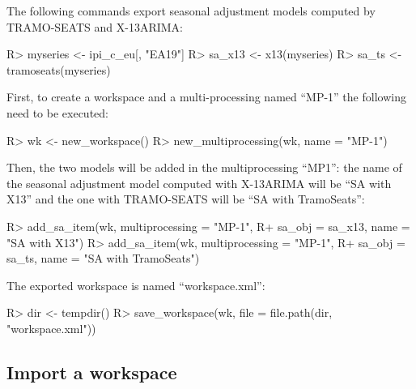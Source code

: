 \documentclass[article]{jss}
\begin{document}
The following commands export seasonal adjustment models computed by
TRAMO-SEATS and X-13ARIMA:

\begin{CodeChunk}

\begin{CodeInput}
R> myseries <- ipi_c_eu[, "EA19"]
R> sa_x13 <- x13(myseries)
R> sa_ts <- tramoseats(myseries)
\end{CodeInput}
\end{CodeChunk}

First, to create a workspace and a multi-processing named ``MP-1'' the
following need to be executed:

\begin{CodeChunk}

\begin{CodeInput}
R> wk <- new_workspace()
R> new_multiprocessing(wk, name = "MP-1")
\end{CodeInput}
\end{CodeChunk}

Then, the two models will be added in the multiprocessing ``MP1'': the
name of the seasonal adjustment model computed with X-13ARIMA will be
``SA with X13'' and the one with TRAMO-SEATS will be ``SA with
TramoSeats'':

\begin{CodeChunk}

\begin{CodeInput}
R> add_sa_item(wk, multiprocessing = "MP-1",
R+             sa_obj = sa_x13, name =  "SA with X13")
R> add_sa_item(wk, multiprocessing =  "MP-1",
R+             sa_obj = sa_ts, name = "SA with TramoSeats")
\end{CodeInput}
\end{CodeChunk}

The exported workspace is named ``workspace.xml'':

\begin{CodeChunk}

\begin{CodeInput}
R> dir <- tempdir()
R> save_workspace(wk, file =  file.path(dir, "workspace.xml"))
\end{CodeInput}
\end{CodeChunk}

\hypertarget{import-a-workspace}{%
\subsection{Import a workspace}\label{import-a-workspace}}
\end{document}
